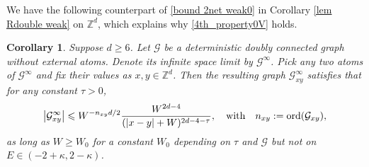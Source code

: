 \documentclass{article}
\newcommand{\1}{\mathds{1}}
\numberwithin{equation}{section}
\newcommand{\ord}{{\rm{ord}}}
\newcommand{\be}{\begin{equation}}
\newcommand{\ee}{\end{equation}}
\renewcommand{\cal}{\mathcal}
\renewcommand{\leq}{\leqslant}
\renewcommand{\geq}{\geqslant}
\renewcommand{\le}{\leq}
\renewcommand{\ge}{\geq}
\newcommand{\Z}{\mathbb{Z}}
\theoremstyle{plain} %
\newtheorem{lemma}[theorem]{Lemma}
\newtheorem{corollary}[theorem]{Corollary}
\theoremstyle{remark}
\newcommand{\Sdelta}{{\Sigma}_T}
\newcommand{\Sele}{{\mathcal E}}
\newcommand{\Selek}{{\mathcal E}}
\newcommand{\Seleinf}{{\mathcal E}^{\infty}}
\newcommand{\Cele}{{\mathscr E}}
\begin{document}
We have the following counterpart of \eqref{bound 2net weak0} in Corollary \ref{lem Rdouble weak} on $\Z^d$, which explains why \eqref{4th_property0V} holds.
 
\begin{corollary}\label{double inf}
Suppose $d\ge 6$. Let $\cal G$ be a deterministic doubly connected graph without external atoms. Denote its infinite space limit by $\cal G^\infty$. Pick any two atoms of $\cal G^\infty$ and fix their values as $x , y\in \Z^d$. Then the resulting graph $\cal G^\infty_{xy}$ satisfies that for any constant $\tau>0$,
\be \nonumber%
\left|\cal G^\infty_{xy}\right| \le   W^{ -  n_{xy} d/2}\frac{W^{2d-4}}{(|x-y|+W)^{2d-4-\tau}}, \quad \text{with} \quad n_{xy}:=\ord(\cal G_{xy}),
\ee
as long as $W\ge W_0$ for a constant $W_0$ depending on $\tau$ and $\cal G$ but not on $E\in (-2+\kappa,2-\kappa)$.
 \end{corollary}
 
\end{document}
